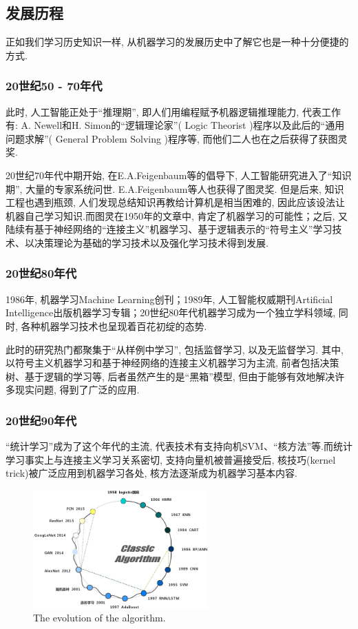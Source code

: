 \documentclass[lang=cn,11pt,a4paper]{elegantpaper}
\begin{document}
\subsection{发展历程}
\par 正如我们学习历史知识一样, 从机器学习的发展历史中了解它也是一种十分便捷的方式. 
\subsubsection*{20世纪50 - 70年代}
\par 此时, 人工智能正处于“推理期”, 即人们用编程赋予机器逻辑推理能力, 代表工作有: A. Newell和H. Simon的“逻辑理论家”( Logic Theorist )程序以及此后的“通用问题求解”( General Problem Solving )程序等, 而他们二人也在之后获得了获图灵奖. 
\par 20世纪70年代中期开始, 在E.A.Feigenbaum等的倡导下, 人工智能研究进入了“知识期”, 大量的专家系统问世. E.A.Feigenbaum等人也获得了图灵奖. 但是后来, 知识工程也遇到瓶颈, 人们发现总结知识再教给计算机是相当困难的, 因此应该设法让机器自己学习知识.而图灵在1950年的文章中, 肯定了机器学习的可能性；之后, 又陆续有基于神经网络的“连接主义”机器学习、基于逻辑表示的“符号主义”学习技术、以决策理论为基础的学习技术以及强化学习技术得到发展.
\subsubsection*{20世纪80年代}
\par 1986年, 机器学习Machine Learning创刊；1989年, 人工智能权威期刊Artificial Intelligence出版机器学习专辑；20世纪80年代机器学习成为一个独立学科领域, 同时, 各种机器学习技术也呈现着百花初绽的态势.
\par 此时的研究热门都聚集于“从样例中学习”, 包括监督学习, 以及无监督学习. 其中, 以符号主义机器学习和基于神经网络的连接主义机器学习为主流, 前者包括决策树、基于逻辑的学习等, 后者虽然产生的是“黑箱”模型, 但由于能够有效地解决许多现实问题, 得到了广泛的应用.
\subsubsection*{20世纪90年代}
“统计学习”成为了这个年代的主流, 代表技术有支持向机SVM、“核方法”等.而统计学习事实上与连接主义学习关系密切, 支持向量机被普遍接受后, 核技巧(kernel trick)被广泛应用到机器学习各处, 核方法逐渐成为机器学习基本内容.

\vspace{10pt}
\begin{figure}[htbp]
	\centering
	\includegraphics[width=0.6\textwidth]{SF}
  	\caption{The evolution of the algorithm.\label{fig:SF}}
\end{figure}
\end{document}
